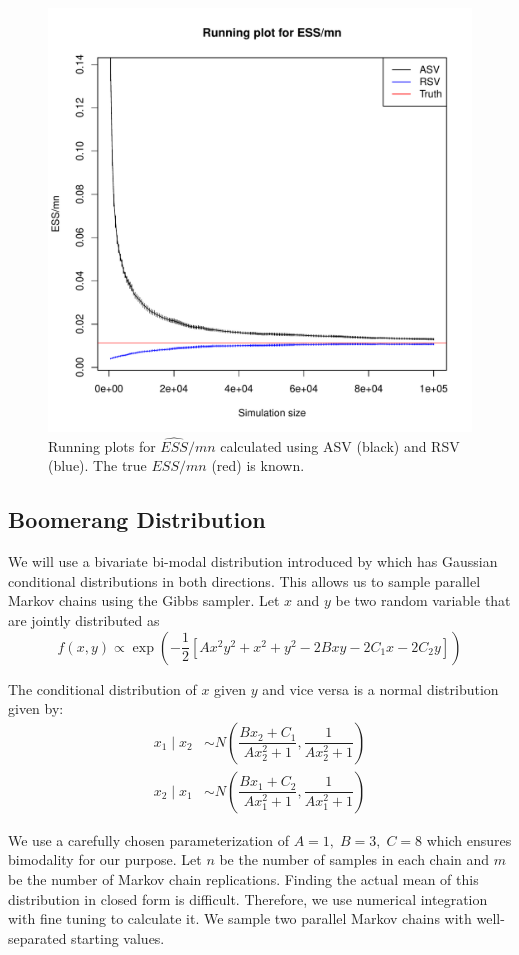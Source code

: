 \documentclass[11pt]{article}
\theoremstyle{remark}
\begin{document}
\begin{figure}[h]
    \centering
    \includegraphics[width = .5\textwidth]{plots/var-ess.pdf}
    \caption{Running plots for $\hat{ESS}/mn$ calculated using ASV (black) and RSV (blue). The true $ESS/mn$ (red) is known.}
    \label{fig:var-ess}
\end{figure}


\subsection{Boomerang Distribution} \label{ex:boomerang}

We will use a bivariate bi-modal distribution introduced by \cite{gelman1991note} which has Gaussian conditional distributions in both directions. This allows us to sample parallel Markov chains using the Gibbs sampler. Let $x$ and $y$ be two random variable that are jointly distributed as 
%
\[
f(x, y) \propto \exp\left(-\dfrac{1}{2}[Ax^2y^2 + x^2 + y^2 -2Bxy  -2C_1x - 2C_2y]\right)
\]

The conditional distribution of $x$ given $y$ and vice versa is a normal distribution given by:
%
\begin{align*}
    x_1 \mid x_2 &\sim N\left(\dfrac{Bx_2 + C_1}{Ax_2^2 + 1}, \dfrac{1}{Ax_2^2 + 1}\right)\\
    x_2 \mid x_1 &\sim N\left(\dfrac{Bx_1 + C_2}{Ax_1^2 + 1}, \dfrac{1}{Ax_1^2 + 1}\right)
\end{align*}

We use a carefully chosen parameterization of $A = 1,\; B = 3,\; C = 8$ which ensures bimodality for our purpose.  Let $n$ be the number of samples in each chain and $m$ be the number of Markov chain replications. Finding the actual mean of this distribution in closed form is difficult. Therefore, we use numerical integration with fine tuning to calculate it. We sample two parallel Markov chains with well-separated starting values. 
\end{document}
